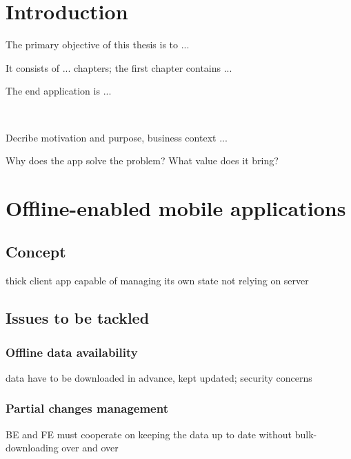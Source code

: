 \documentclass[
  digital,     %
  color,       %
  oneside,     %
  nosansbold,  %
  nocolorbold, %
  lof,         %
  lot,         %
]{fithesis4}
\begin{document}
\chapter*{Introduction}

The primary objective of this thesis is to ... 

It consists of ... chapters; the first chapter contains ... 

The end application is ...

~

Decribe motivation and purpose, business context ...

Why does the app solve the problem? What value does it bring?

\chapter{Offline-enabled mobile applications}
\section{Concept}
thick client app capable of managing its own state not relying on server
\section{Issues to be tackled}
\subsection{Offline data availability}
data have to be downloaded in advance, kept updated; security concerns
\subsection{Partial changes management}
BE and FE must cooperate on keeping the data up to date without bulk-downloading over and over
\end{document}

